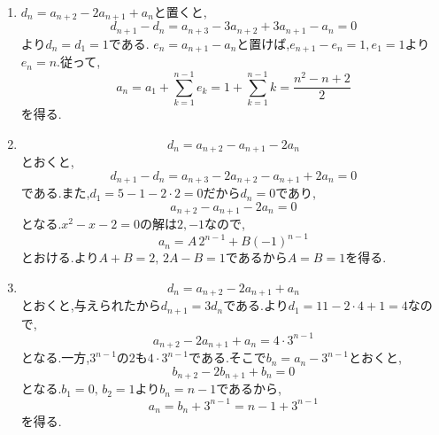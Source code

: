 \noindent{}\par\nobreak
\begin{enumerate}[label=(\arabic*),parsep=3pt,format=\bookitemlink{example-four-term-1}{solution}{problem}]
  \item $d_n=a_{n+2}-2a_{n+1}+a_n$と置くと,
    \[
      d_{n+1}-d_n=a_{n+3}-3a_{n+2}+3a_{n+1}-a_n=0
    \]
    より$d_n=d_1=1$である.
    $e_n=a_{n+1}-a_n$と置けば,$e_{n+1}-e_n=1,e_1=1$より$e_n=n$.従って,
    \[
      a_n=a_1+\sum_{k=1}^{n-1}e_k
      =1+\sum_{k=1}^{n-1}k
      =\frac{n^2-n+2}{2}
    \]
    を得る.
  \item
    \[
      d_n=a_{n+2}-a_{n+1}-2a_n
    \]
    とおくと,
    \[
      d_{n+1}-d_n=a_{n+3}-2a_{n+2}-a_{n+1}+2a_n=0
    \]
    である.また,$d_1=5-1-2\cdot2=0$だから$d_n=0$であり,
    \[
      a_{n+2}-a_{n+1}-2a_n=0
    \]
    となる.$x^2-x-2=0$の解は$2,-1$なので,
    \[
      a_n=A\,2^{n-1}+B(-1)^{n-1}
    \]
    とおける.より$A+B=2,\,2A-B=1$であるから$A=B=1$を得る.
  \item
    \[
      d_n=a_{n+2}-2a_{n+1}+a_n
    \]
    とおくと,与えられたから$d_{n+1}=3d_n$である.より$d_1=11-2\cdot4+1=4$なので,
    \[
      a_{n+2}-2a_{n+1}+a_n=4\cdot3^{n-1}
    \]
    となる.一方,$3^{n-1}$の2も$4\cdot3^{n-1}$である.そこで$b_n=a_n-3^{n-1}$とおくと,
    \[
      b_{n+2}-2b_{n+1}+b_n=0
    \]
    となる.$b_1=0,\,b_2=1$より$b_n=n-1$であるから,
    \[
      a_n=b_n+3^{n-1}=n-1+3^{n-1}
    \]
    を得る.
\end{enumerate}
